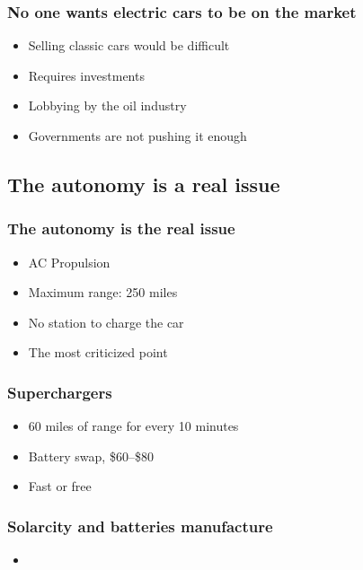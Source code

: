 \begin{frame}
\frametitle{No one wants electric cars to be on the market}
\begin{itemize}
    \itemsep1.5em
    \item Selling classic cars would be difficult %
    \item Requires investments
    \item Lobbying by the oil industry  %
    \item Governments are not pushing it enough %
\end{itemize}
\end{frame}


\subsection{The autonomy is a real issue}

\begin{frame}
\frametitle{The autonomy is the real issue}
\begin{itemize}
    \itemsep1.5em
    \item AC Propulsion
    \item Maximum range: 250 miles
    \item No station to charge the car
    \item The most criticized point
\end{itemize}
\end{frame}

\begin{frame}
\frametitle{Superchargers}
\begin{itemize}
    \itemsep1.5em
    \item 60 miles of range for every 10 minutes
    \item Battery swap, \$60--\$80
    \item Fast or free
\end{itemize}
\end{frame}


\begin{frame}
\frametitle{Solarcity and batteries manufacture}
\begin{itemize}
    \itemsep1.5em
    \item
\end{itemize}
\end{frame}


